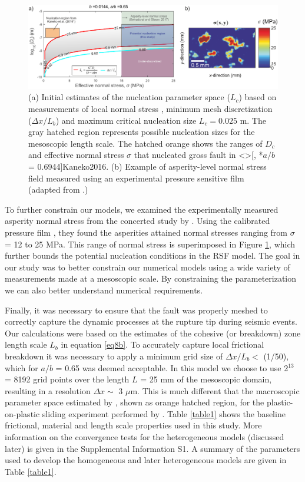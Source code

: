 \documentclass[draft]{agujournal2019}
\begin{document}
\begin{figure}
	\centering
	\includegraphics[scale = 0.95]{FIG4.pdf} 
	\caption{(a) Initial estimates of the nucleation parameter space ($L_{c}$) based on measurements of local normal stress \cite{Selvadurai2017}, minimum mesh discretization ($\Delta x /L_{b}$) and maximum critical nucleation size $L_{c} = 0.025$ m. The gray hatched region represents possible nucleation sizes for the mesoscopic length scale.  The hatched orange shows the ranges of $D_{c}$ and effective normal stress $\sigma$ that nucleated gross fault in \citeA<>[, *$a/b$ = 0.6944]{Kaneko2016}. (b) Example of asperity-level normal stress field measured using an experimental pressure sensitive film (adapted from .)}
	\label{fig4}
\end{figure}

To further constrain our models, we examined the experimentally measured asperity normal stress from the concerted study by . Using the calibrated pressure film \cite{Selvadurai2015}, they found the asperities attained normal stresses ranging from $\sigma$ = 12 to 25 MPa. This range of normal stress is superimposed in Figure \ref{fig4}, which further bounds the potential nucleation conditions in the RSF model.  The goal in our study was to better constrain our numerical models using a wide variety of measurements made at a mesoscopic scale.  By constraining the parameterization we can also better understand numerical requirements.  

Finally, it was necessary to ensure that the fault was properly meshed to correctly capture the dynamic processes at the rupture tip during seismic events. Our calculations were based on the estimates of the cohesive (or breakdown) zone length scale $L_{b}$ in equation \eqref{eq8b}. To accurately capture local frictional breakdown it was necessary to apply a minimum grid size of $\Delta x/L_{b} <$ (1/50), which for $a/b$ = 0.65 was deemed acceptable.  In this model we choose to use 2$^{13}$ = 8192 grid points over the length $L$ = 25 mm of the mesoscopic domain, resulting in a resolution $\Delta x \sim$  3 $\mu$m. This is much different that the macroscopic parameter space estimated by , shown as orange hatched region, for the plastic-on-plastic sliding experiment performed by . Table \ref{table1} shows the baseline frictional, material and length scale properties used in this study. More information on the convergence tests for the heterogeneous models (discussed later) is given in the Supplemental Information S1. A summary of the parameters used to develop the homogeneous and later heterogeneous models are given in Table \ref{table1}.
\end{document}
